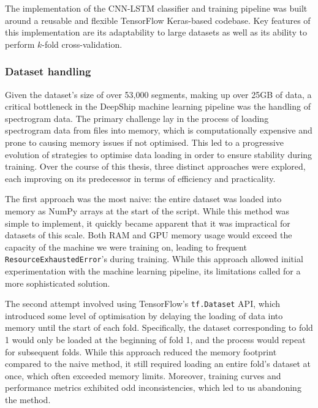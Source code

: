 The implementation of the CNN-LSTM classifier and training pipeline was built around a reusable and flexible TensorFlow Keras-based codebase. Key features of this implementation are its adaptability to large datasets as well as its ability to perform $k$-fold cross-validation. 

\subsubsection{Dataset handling}

Given the dataset's size of over 53,000 segments, making up over 25GB of data, a critical bottleneck in the DeepShip machine learning pipeline was the handling of spectrogram data. The primary challenge lay in the process of loading spectrogram data from files into memory, which is computationally expensive and prone to causing memory issues if not optimised. This led to a progressive evolution of strategies to optimise data loading in order to ensure stability during training. Over the course of this thesis, three distinct approaches were explored, each improving on its predecessor in terms of efficiency and practicality.

The first approach was the most naive: the entire dataset was loaded into memory as NumPy arrays at the start of the script. While this method was simple to implement, it quickly became apparent that it was impractical for datasets of this scale. Both RAM and GPU memory usage would exceed the capacity of the machine we were training on, leading to frequent \texttt{ResourceExhaustedError}'s during training. While this approach allowed initial experimentation with the machine learning pipeline, its limitations called for a more sophisticated solution.

The second attempt involved using TensorFlow's \texttt{tf.Dataset} API, which introduced some level of optimisation by delaying the loading of data into memory until the start of each fold. Specifically, the dataset corresponding to fold 1 would only be loaded at the beginning of fold 1, and the process would repeat for subsequent folds. While this approach reduced the memory footprint compared to the naive method, it still required loading an entire fold's dataset at once, which often exceeded memory limits. Moreover, training curves and performance metrics exhibited odd inconsistencies, which led to us abandoning the method.

